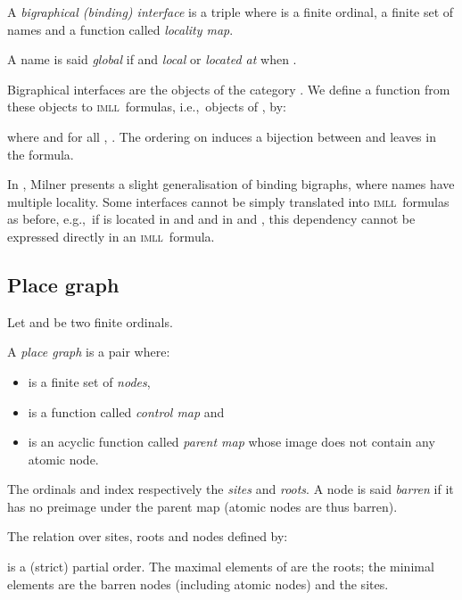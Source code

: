\documentclass{llncs}
\newcommand{\intro}[1]{\emph{#1}}
\newcommand{\ie}{i.e.,}
\newcommand{\eg}{e.g.,}
\newcommand{\imll}{\textsc{imll}}
\begin{document}
\begin{definition}
  A \intro{bigraphical (binding) interface} is a triple  where  is a finite ordinal,  a finite set of
  names and  a function
  called \intro{locality map}.
\end{definition}
A name  is said \emph{global} if  and \emph{local} or
\emph{located at } when .

Bigraphical interfaces are the objects of the category .
We define a function  from these objects to \imll\ formulas, \ie\
objects of , by:

  where  and for all , .
  The ordering on  induces a bijection between  and   leaves in the formula. 

In \cite{Milner:bigraphs2}, Milner presents a slight generalisation of binding
bigraphs, where names have multiple locality.
Some interfaces cannot be simply translated into \imll\ formulas as before,
\eg\ if  is located in  and  and  in  and , this dependency
cannot be expressed directly in an \imll\ formula.

\subsection{Place graph}
Let  and  be two finite ordinals. 
\begin{definition}
    A \intro{place graph}  is a pair where:
    \begin{itemize}
	\item  is a finite set of \emph{nodes},
	\item  is a function called \emph{control map} and
	\item  is an acyclic function
	    called \emph{parent map} whose image does not contain any
	    atomic node.
    \end{itemize}
\end{definition}
The ordinals  and  index respectively the \emph{sites} and \emph{roots}.
A node is said \emph{barren} if it has no preimage under the parent map (atomic
nodes are thus barren). 

The relation  over sites, roots and nodes defined by:

is a (strict) partial order. 
The maximal elements of  are the roots; the minimal elements are the
barren nodes (including atomic nodes) and the sites. 
\end{document}
